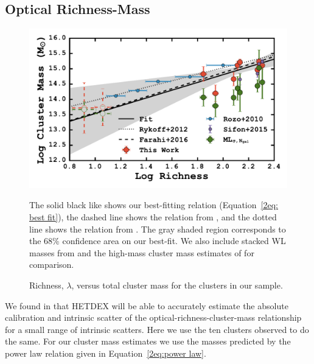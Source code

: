 \subsection{Optical Richness-Mass}
\begin{figure}
	\begin{center}
		\includegraphics[width=\textwidth]{./figures2/massRichness.pdf} 
	\end{center}
	\caption{Richness, $\lambda$, versus total cluster mass for the clusters in our sample.} 
	The solid black like shows our best-fitting relation (Equation~\protect\ref{2eq: best fit}), the dashed line shows the relation from \protect\cite{Farahi2016}, and the dotted line shows the relation from \protect\cite{Rykoff2012}. The gray shaded region corresponds to the 68\% confidence area on our best-fit. We also include stacked WL masses from \protect\cite{Rozo2010} and the high-mass cluster mass estimates of \protect\cite{Sifon2015} for comparison.
\label{2fig:massRichness} 
\end{figure}

We found in  that HETDEX will be able to accurately estimate the absolute calibration and intrinsic scatter of the optical-richness-cluster-mass relationship for a small range of intrinsic scatters. Here we use the ten clusters observed to do the same. For our cluster mass estimates we use the masses predicted by the power law relation given in Equation~\ref{2eq:power law}. 

